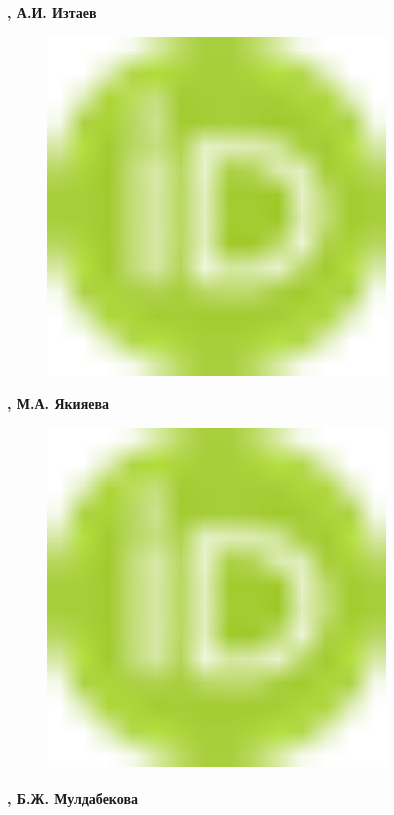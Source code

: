 {\bfseries , А.И.
Изтаев}
\begin{figure}[H]
	\centering
	\includegraphics[width=0.8\textwidth]{media/pish/image10}
	\caption*{}
\end{figure}
{\bfseries ,
М.А.
Якияева}
\begin{figure}[H]
	\centering
	\includegraphics[width=0.8\textwidth]{media/pish/image10}
	\caption*{}
\end{figure}
{\bfseries \textsuperscript{\envelope },
Б.Ж.
Мулдабекова}
